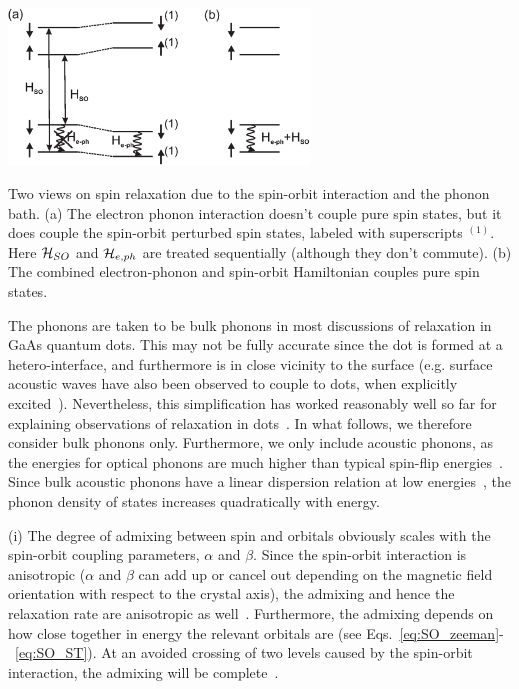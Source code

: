 \documentclass[rmp,twocolumn,aps]{revtex4}
\begin{document}
\bfig
\includegraphics[width=8cm]{hanson_fig20.eps}
\caption{Two views on spin relaxation due to the spin-orbit
interaction and the phonon bath. (a) The electron phonon
interaction doesn't couple pure spin states, but it does couple
the spin-orbit perturbed spin states, labeled with superscripts $^{(1)}$. 
Here ${\cal H}_{SO}$ and ${\cal H}_{e,ph}$ are treated sequentially 
(although they don't commute). (b) The combined
electron-phonon and spin-orbit Hamiltonian couples pure spin
states.} \label{fig:relaxation} \efig

The phonons are taken to be bulk phonons in most discussions of relaxation in GaAs quantum dots. This may not be fully accurate since the dot is formed at a hetero-interface, and furthermore is in close vicinity to the surface (e.g. surface acoustic waves have also been observed to couple to dots, when explicitly excited~\cite{naber06}). Nevertheless, this simplification has worked reasonably well so far for explaining observations of relaxation in dots~\cite{fujisawa98,kroutvar04,amasha06,meunier07}. 
In what follows, we therefore consider bulk phonons only. Furthermore, we only include acoustic phonons, as the energies for optical phonons are much higher than typical spin-flip energies~\cite{ashcroft}. Since bulk acoustic phonons have a linear dispersion relation at low energies~\cite{ashcroft}, the phonon density of states increases quadratically with energy.

(i) The degree of admixing between spin and orbitals obviously scales with the spin-orbit coupling parameters, $\alpha$ and $\beta$. Since the spin-orbit interaction is anisotropic ($\alpha$ and $\beta$ can add up or cancel out depending on the magnetic field orientation with respect to the crystal axis), the admixing and hence the relaxation rate are anisotropic as well~\cite{falko05}. Furthermore, the admixing depends on how close together in energy the relevant orbitals are (see Eqs.~\ref{eq:SO_zeeman}-~\ref{eq:SO_ST}). At an avoided crossing of two levels caused by the spin-orbit interaction, the admixing will be complete~\cite{bulaev05,stano05,stano06}.
\end{document}
